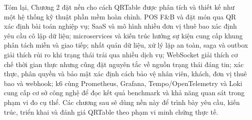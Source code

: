 Tóm lại, Chương 2 đặt nền cho cách QRTable được phân tích và thiết kế như một hệ thống kỹ thuật phần mềm hoàn chỉnh. POS F\&B và đặt món qua QR xác định bài toán nghiệp vụ; SaaS và mô hình nhiều đơn vị thuê bao xác định yêu cầu cô lập dữ liệu; microservices và kiến trúc hướng sự kiện cung cấp khung phân tách miền và giao tiếp; nhất quán dữ liệu, xử lý lặp an toàn, saga và outbox giải thích rủi ro khi trạng thái trải qua nhiều dịch vụ; WebSocket giải thích cơ chế thời gian thực nhưng cũng đặt nguyên tắc về nguồn trạng thái đáng tin; xác thực, phân quyền và bảo mật xác định cách bảo vệ nhân viên, khách, đơn vị thuê bao và webhook; k6 cùng Prometheus, Grafana, Tempo/OpenTelemetry và Loki cung cấp cơ sở công nghệ để đọc kết quả benchmark và khả năng quan sát trong phạm vi đo cụ thể. Các chương sau sẽ dùng nền này để trình bày yêu cầu, kiến trúc, triển khai và đánh giá QRTable theo phạm vi minh chứng thực tế.
